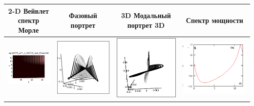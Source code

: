 \documentclass[12pt,letterpaper]{extreport}
\begin{document}
\begin{table}[H]
{\begin{tabular}{|c|c|c|c|}
\hline
\footnotesize 2-D Вейвлет спектр Морле&\footnotesize Фазовый 
портрет&\footnotesize 3D Модальный портрет 3D&\footnotesize Спектр мощности\\
\hline
	\includegraphics[scale=1]{b1} 	
	&	
	\includegraphics[scale=0.9]{b2} 	
	&	
	\includegraphics[scale=0.9]{b3} 
	&
	\includegraphics[scale=0.9]{b4} 
\\
\hline


\end{tabular}}
\end{table}
\end{document}
